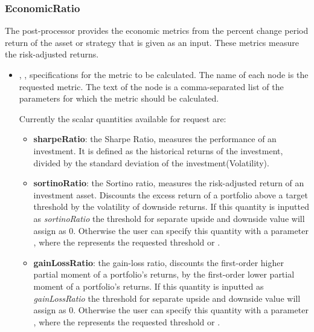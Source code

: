 \subsubsection{EconomicRatio}
\label{EconomicRatio}
The  post-processor provides the economic metrics from the percent change
period return of the asset or strategy that is given as an input. These metrics measure the risk-adjusted returns.
%

\begin{itemize}
  \item {}, ,
  specifications for the metric to be calculated. The name of each node is the requested metric.
  The text of the node is a comma-separated list of the parameters for which the metric should be calculated.

  Currently the scalar quantities available for request are:
  \begin{itemize}

  \item \textbf{sharpeRatio}: the Sharpe Ratio, measures the performance of an investment. It is defined as the  historical returns of the investment, divided by the standard deviation of the investment(Volatility).
  \item \textbf{sortinoRatio}: the Sortino ratio, measures the risk-adjusted return of an investment asset. Discounts the excess return of a portfolio above a target threshold by the volatility of downside returns. If this quantity is inputted as \textit{sortinoRatio} the threshold for separate upside and downside value will assign as $0$. Otherwise the user can specify this quantity with a parameter , where the  represents the requested threshold  or .

  \item \textbf{gainLossRatio}: the gain-loss ratio, discounts the first-order higher partial moment of a portfolio's returns, by the first-order lower partial moment of a portfolio's returns. If this quantity is inputted as \textit{gainLossRatio} the threshold for separate upside and downside value will assign as $0$. Otherwise the user can specify this quantity with a parameter , where the  represents the requested threshold  or .



\end{itemize}
\end{itemize}
